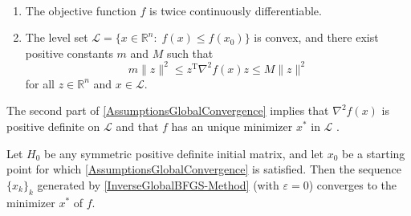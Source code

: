 \begin{assumption}\label{AssumptionsGlobalConvergence} \ \\[-1.5\baselineskip]
    \begin{enumerate}
        \item The objective function $f$ is twice continuously differentiable.
        \item The level set $\mathcal{L} = \{ x \in \mathbb{R}^n \colon \; f(x) \leq f(x_0) \}$ is convex, and there exist positive constants $m$ and $M$ such that \begin{equation*} m \lVert z \rVert^2 \leq z^{\mathrm{T}} \nabla^2 f(x) z \leq M \lVert z \rVert^2 \end{equation*} for all $z \in \mathbb{R}^n$ and $x \in \mathcal{L}$.
    \end{enumerate}
\end{assumption}

The second part of \cref{AssumptionsGlobalConvergence} implies that $\nabla^2 f(x)$ is positive definite on $\mathcal{L}$ and that $f$ has an unique minimizer $x^*$ in $\mathcal{L}$ \cite[p.~153]{NocedalWright:2006}.

\begin{theorem}\label{GlobalConvergence}
    Let $H_0$ be any symmetric positive definite initial matrix, and let $x_0$ be a starting point for which \cref{AssumptionsGlobalConvergence} is satisfied. Then the sequence $\{ x_k \}_k$ generated by \cref{InverseGlobalBFGS-Method} (with $\varepsilon = 0$) converges to the minimizer $x^*$ of $f$.
\end{theorem}

